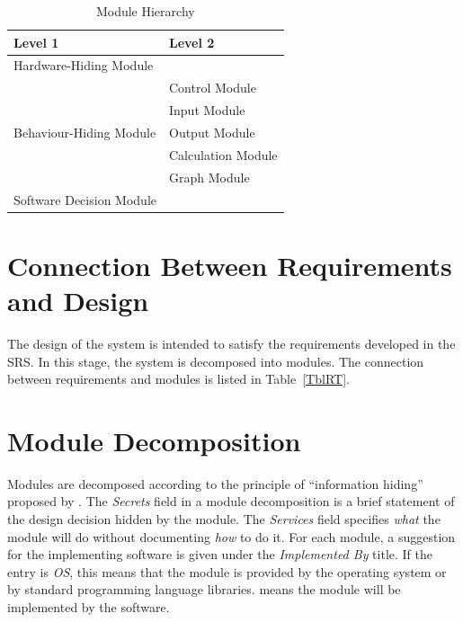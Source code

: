\documentclass[12pt, titlepage]{article}
\begin{document}
\begin{table}[h!]
\centering
\begin{tabular}{p{} p{}}
\toprule
\textbf{Level 1} & \textbf{Level 2}\\
\midrule

{Hardware-Hiding Module} & ~ \\
\midrule

\multirow{5}{0.3\textwidth}{Behaviour-Hiding Module} 
& Control Module\\
& Input Module\\
& Output Module\\
& Calculation Module\\
& Graph Module\\
\midrule

\multirow{1}{0.3\textwidth}{Software Decision Module} 
& \\
\bottomrule

\end{tabular}
\caption{Module Hierarchy}
\label{TblMH}
\end{table}

\section{Connection Between Requirements and Design} \label{SecConnection}

The design of the system is intended to satisfy the requirements developed in
the SRS. In this stage, the system is decomposed into modules. The connection
between requirements and modules is listed in Table~\ref{TblRT}.

\newpage

\section{Module Decomposition} \label{SecMD}

Modules are decomposed according to the principle of ``information hiding''
proposed by \cite{ParnasEtAl1984}. The \emph{Secrets} field in a module
decomposition is a brief statement of the design decision hidden by the
module. The \emph{Services} field specifies \emph{what} the module will do
without documenting \emph{how} to do it. For each module, a suggestion for the
implementing software is given under the \emph{Implemented By} title. If the
entry is \emph{OS}, this means that the module is provided by the operating
system or by standard programming language libraries.  \emph{\progname{}} means the
module will be implemented by the \progname{} software.
\end{document}
